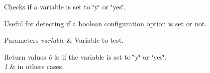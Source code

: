 Checks if a variable is set to \char`\"{}y\char`\"{} or \char`\"{}yes\char`\"{}. 

Useful for detecting if a boolean configuration option is set or not. 
\begin{DoxyParams}{Parameters}
{\em variable} & Variable to test. \\
\hline
\end{DoxyParams}

\begin{DoxyRetVals}{Return values}
{\em 0} & if the variable is set to \char`\"{}y\char`\"{} or \char`\"{}yes\char`\"{}. \\
\hline
{\em 1} & in others cases. \\
\hline
\end{DoxyRetVals}
